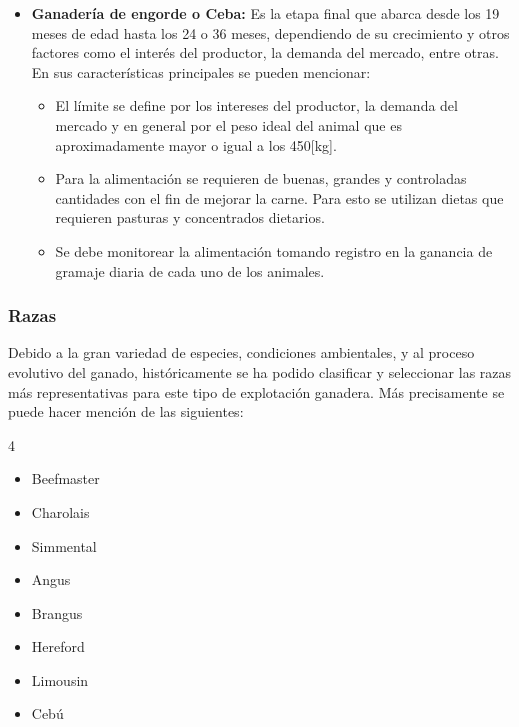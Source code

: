 \begin{itemize}
\begin{itemize}
	\end{itemize}
	\item \textbf{Ganadería de engorde o Ceba:} Es la etapa final que abarca desde los 19 meses de edad hasta los 24 o 36 meses, dependiendo de su crecimiento  y otros factores como el interés del productor, la demanda del mercado, entre otras. En sus características principales se pueden mencionar:
	\begin{itemize}
		\item El límite se define por los intereses del productor, la demanda del mercado y en general por el peso ideal del animal que es aproximadamente mayor o igual a los 450[kg].
		\item Para la alimentación se requieren de buenas, grandes y controladas cantidades con el fin de mejorar la carne. Para esto se utilizan dietas que requieren pasturas y concentrados dietarios.
		\item Se debe monitorear la alimentación tomando registro en la ganancia de gramaje diaria de cada uno de los animales.
	\end{itemize}
\end{itemize}

\subsubsection{Razas} Debido a la gran variedad de especies, condiciones ambientales, y al proceso evolutivo del ganado, históricamente se ha podido clasificar y seleccionar las razas más representativas para este tipo de explotación ganadera. Más precisamente se puede hacer mención de las siguientes:
\begin{multicols}{4}
\begin{center}
\begin{itemize}
\item Beefmaster
\item Charolais
\item Simmental
\item Angus
\item Brangus
\item Hereford
\item Limousin
\item Cebú
\end{itemize}
\end{center}
\end{multicols}

